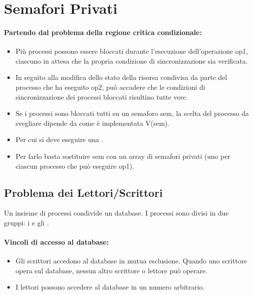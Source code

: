 \section{Semafori Privati}

\paragraph{Partendo dal problema della regione critica condizionale:}

\begin{itemize}
	\item Più processi possono essere bloccati durante l’esecuzione
	      dell’operazione op1, ciascuno in attesa che la propria condizione di
	      sincronizzazione sia verificata.
	\item In seguito alla modifica dello stato della risorsa condivisa da parte
	      del processo che ha eseguito op2, può accadere che le condizioni di
	      sincronizzazione dei processi bloccati risultino tutte vere.
	\item Se i processi sono bloccati tutti su un semaforo sem, la scelta del
	      processo da svegliare dipende da come è implementata V(sem).
	\item Per cui si deve eseguire una .
	\item Per farlo basta sostituire sem con un array di semafori privati (uno per ciascun processo che può eseguire op1).
\end{itemize}

\subsection{Problema dei Lettori/Scrittori}

Un insieme di processi condivide un database. I processi sono divisi in due gruppi: i  e gli .

\paragraph{Vincoli di accesso al database:}

\begin{itemize}
	\item Gli scrittori accedono al database in mutua esclusione. Quando uno
	      scrittore opera sul database, nessun altro scrittore o lettore può operare.
	\item I lettori possono accedere al database in un numero arbitrario.
\end{itemize}

